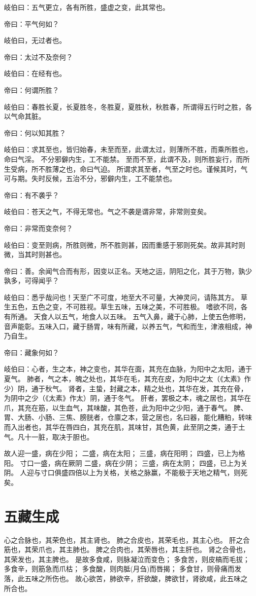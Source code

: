 \documentclass{article}%
\begin{document}
岐伯曰：五气更立，各有所胜，盛虚之变，此其常也。

帝曰：平气何如？

岐伯曰，无过者也。

帝曰：太过不及奈何？

岐伯曰：在经有也。

帝曰：何谓所胜？

岐伯曰：春胜长夏，长夏胜冬，冬胜夏，夏胜秋，秋胜春，所谓得五行时之胜，各以气命其脏。

帝曰：何以知其胜？

岐伯曰：求其至也，皆归始春，未至而至，此谓太过，则薄所不胜，而乘所胜也，命曰气淫。
不分邪僻内生，工不能禁。
至而不至，此谓不及，则所胜妄行，而所生受病，所不胜薄之也，命曰气迫。
所谓求其至者，气至之时也。谨候其时，气可与期。失时反候，五治不分，邪僻内生，工不能禁也。

帝曰：有不袭乎？

岐伯曰：苍天之气，不得无常也。气之不袭是谓非常，非常则变矣。

帝曰：非常而变奈何？

岐伯曰：变至则病，所胜则微，所不胜则甚，因而重感于邪则死矣。故非其时则微，当其时则甚也。

帝曰：善。余闻气合而有形，因变以正名。天地之运，阴阳之化，其于万物，孰少孰多，可得闻乎？

岐伯曰：悉乎哉问也！天至广不可度，地至大不可量，大神灵问，请陈其方。
草生五色，五色之变，不可胜视。草生五味，五味之美，不可胜极。
嗜欲不同，各有所通。
天食人以五气，地食人以五味。
五气入鼻，藏于心肺，上使五色修明，音声能彰。五味入口，藏于肠胃，味有所藏，以养五气，气和而生，津液相成，神乃自生。

帝曰：藏象何如？

岐伯曰：心者，生之本，神之变也，其华在面，其充在血脉，为阳中之太阳，通于夏气。
肺者，气之本，魄之处也，其华在毛，其充在皮，为阳中之太（《太素》作少）阴，通于秋气。
肾者，主蛰，封藏之本，精之处也，其华在发，其充在骨，为阴中之少（《太素》作太）阴，通于冬气。
肝者，罢极之本，魂之居也，其华在爪，其充在筋，以生血气，其味酸，其色苍，此为阳中之少阳，通于春气。
脾、胃、大肠、小肠、三焦、膀胱者，仓廪之本，营之居也，名曰器，能化糟粕，转味而入出者也，其华在唇四白，其充在肌，其味甘，其色黄，此至阴之类，通于土气。凡十一脏，取决于胆也。

故人迎一盛，病在少阳；
二盛，病在太阳；
三盛，病在阳明；
四盛，已上为格阳。
寸口一盛，病在厥阴
二盛，病在少阴；
三盛，病在太阴；
四盛，已上为关阴。
人迎与寸口俱盛四倍以上为关格，关格之脉赢，不能极于天地之精气，则死矣。


\section{五藏生成}
心之合脉也，其荣色也，其主肾也。
肺之合皮也，其荣毛也，其主心也。
肝之合筋也，其荣爪也，其主肺也。
脾之合肉也，其荣唇也，其主肝也。
肾之合骨也，其荣发也，其主脾也。
是故多食咸，则脉凝泣而变色；
多食苦，则皮槁而毛拔；
多食辛，则筋急而爪枯；
多食酸，则肉胝(月刍)而唇揭；
多食甘，则骨痛而发落，此五味之所伤也。
故心欲苦，肺欲辛，肝欲酸，脾欲甘，肾欲咸，此五味之所合也。
\end{document}
